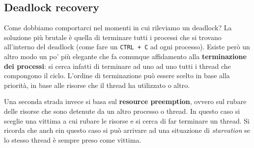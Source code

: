 \subsection{Deadlock recovery}\label{recovery}
Come dobbiamo comportarci nel momenti in cui rileviamo un deadlock? La soluzione più brutale è quella di terminare tutti i processi che si trovano all'interno del deadlock (come fare un \texttt{CTRL + C} ad ogni processo). Esiste però un altro modo un po' più elegante che fa comunque affidamento alla \textbf{terminazione dei processi}: si cerca infatti di terminare ad uno ad uno tutti i thread che compongono il ciclo. L'ordine di terminazione può essere scelto in base alla priorità, in base alle risorse che il thread ha utilizzato o altro.

Una seconda strada invece si basa sul \textbf{resource preemption}, ovvero sul rubare delle risorse che sono detenute da un altro processo o thread. In questo caso si sceglie una vittima a cui rubare le risorse e si cerca di far terminare un thread. Si ricorda che anch ein questo caso si può arrivare ad una situazione di \textit{starvation} se lo stesso thread è sempre preso come vittima.
